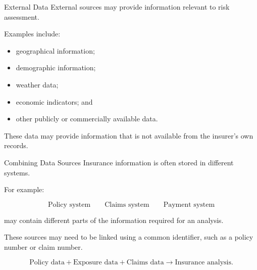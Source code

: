 \documentclass[
  ignorenonframetext,
  aspectratio=169,
]{beamer}
\providecommand{\tightlist}{%
  \setlength{\itemsep}{0pt}\setlength{\parskip}{0pt}}
\begin{document}
\begin{frame}{External Data}
\protect{}\label{external-data}
External sources may provide information relevant to risk assessment.

Examples include:

\begin{itemize}
\tightlist
\item
  geographical information;
\item
  demographic information;
\item
  weather data;
\item
  economic indicators; and
\item
  other publicly or commercially available data.
\end{itemize}

These data may provide information that is not available from the
insurer's own records.
\end{frame}

\begin{frame}{Combining Data Sources}
\protect{}\label{combining-data-sources}
Insurance information is often stored in different systems.

For example:

\[
\text{Policy system}
\qquad
\text{Claims system}
\qquad
\text{Payment system}
\]

may contain different parts of the information required for an analysis.

These sources may need to be linked using a common identifier, such as a
policy number or claim number.

\[
\text{Policy data}
+
\text{Exposure data}
+
\text{Claims data}
\longrightarrow
\text{Insurance analysis}.
\]
\end{frame}
\end{document}
